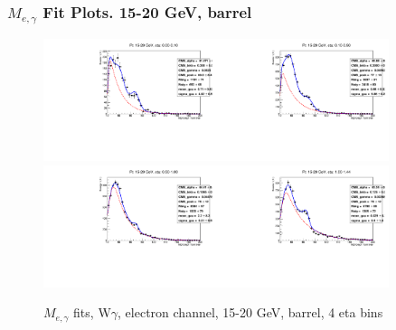 \begin{frame}\frametitle{$M_{e,\gamma}$ Fit Plots. 15-20 GeV, barrel}
\begin{figure}[htb]
  \begin{center}
   \includegraphics[width=0.45\textwidth]{../figs/figs_v11/ELECTRON_WGamma/EtoGammaFits/sa_hZmass_h_Data_EtoGamma_Enr_BARREL_pt15to20_ieta0.pdf}\includegraphics[width=0.45\textwidth]{../figs/figs_v11/ELECTRON_WGamma/EtoGammaFits/sa_hZmass_h_Data_EtoGamma_Enr_BARREL_pt15to20_ieta1.pdf}\\
   \includegraphics[width=0.45\textwidth]{../figs/figs_v11/ELECTRON_WGamma/EtoGammaFits/sa_hZmass_h_Data_EtoGamma_Enr_BARREL_pt15to20_ieta2.pdf}\includegraphics[width=0.45\textwidth]{../figs/figs_v11/ELECTRON_WGamma/EtoGammaFits/sa_hZmass_h_Data_EtoGamma_Enr_BARREL_pt15to20_ieta3.pdf}\\
  \caption{$M_{e,\gamma}$ fits, W$\gamma$, electron channel, 15-20 GeV, barrel, 4 eta bins}
  \end{center}
\end{figure}
\end{frame}%

